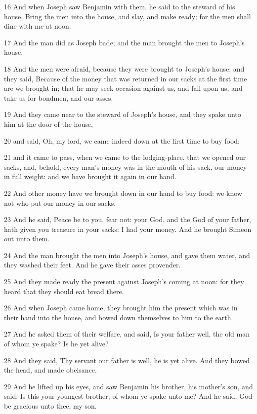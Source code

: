 \par 16 And when Joseph saw Benjamin with them, he said to the steward of his house, Bring the men into the house, and slay, and make ready; for the men shall dine with me at noon.
\par 17 And the man did as Joseph bade; and the man brought the men to Joseph's house.
\par 18 And the men were afraid, because they were brought to Joseph's house; and they said, Because of the money that was returned in our sacks at the first time are we brought in; that he may seek occasion against us, and fall upon us, and take us for bondmen, and our asses.
\par 19 And they came near to the steward of Joseph's house, and they spake unto him at the door of the house,
\par 20 and said, Oh, my lord, we came indeed down at the first time to buy food:
\par 21 and it came to pass, when we came to the lodging-place, that we opened our sacks, and, behold, every man's money was in the mouth of his sack, our money in full weight: and we have brought it again in our hand.
\par 22 And other money have we brought down in our hand to buy food: we know not who put our money in our sacks.
\par 23 And he said, Peace be to you, fear not: your God, and the God of your father, hath given you treasure in your sacks: I had your money. And he brought Simeon out unto them.
\par 24 And the man brought the men into Joseph's house, and gave them water, and they washed their feet. And he gave their asses provender.
\par 25 And they made ready the present against Joseph's coming at noon: for they heard that they should eat bread there.
\par 26 And when Joseph came home, they brought him the present which was in their hand into the house, and bowed down themselves to him to the earth.
\par 27 And he asked them of their welfare, and said, Is your father well, the old man of whom ye spake? Is he yet alive?
\par 28 And they said, Thy servant our father is well, he is yet alive. And they bowed the head, and made obeisance.
\par 29 And he lifted up his eyes, and saw Benjamin his brother, his mother's son, and said, Is this your youngest brother, of whom ye spake unto me? And he said, God be gracious unto thee, my son.

